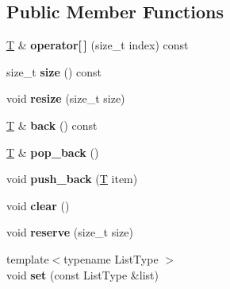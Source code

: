 \subsection*{Public Member Functions}
\begin{DoxyCompactItemize}
\item 
\mbox{\label{class_arena_vector_base_a71169c2ecfc1361b8fc5ffd2016c47d2}} 
\mbox{\hyperlink{struct_t}{T}} \& {\bfseries operator\mbox{[}$\,$\mbox{]}} (size\+\_\+t index) const
\item 
\mbox{\label{class_arena_vector_base_a466ddde8f74c25dad52e0c8eda8a1f58}} 
size\+\_\+t {\bfseries size} () const
\item 
\mbox{\label{class_arena_vector_base_a22fb72c9242fde81fea5ca432ae721cc}} 
void {\bfseries resize} (size\+\_\+t size)
\item 
\mbox{\label{class_arena_vector_base_af845bca4e5ee7c7108b25e435569fd1b}} 
\mbox{\hyperlink{struct_t}{T}} \& {\bfseries back} () const
\item 
\mbox{\label{class_arena_vector_base_a332b5c9af46c5f9280ec9a571ebd1c32}} 
\mbox{\hyperlink{struct_t}{T}} \& {\bfseries pop\+\_\+back} ()
\item 
\mbox{\label{class_arena_vector_base_a698d93a4f3403c3aa510797345f1c7ab}} 
void {\bfseries push\+\_\+back} (\mbox{\hyperlink{struct_t}{T}} item)
\item 
\mbox{\label{class_arena_vector_base_a858a2089aae4dfdb2c56f9587494dcc8}} 
void {\bfseries clear} ()
\item 
\mbox{\label{class_arena_vector_base_a26f6212ededceceb33b753fad3b632c5}} 
void {\bfseries reserve} (size\+\_\+t size)
\item 
\mbox{\label{class_arena_vector_base_a06022a4a152f5ac7b8a1991d30aa3ed3}} 
{\footnotesize template$<$typename List\+Type $>$ }\\void {\bfseries set} (const List\+Type \&list)
\item 

\end{DoxyCompactItemize}

